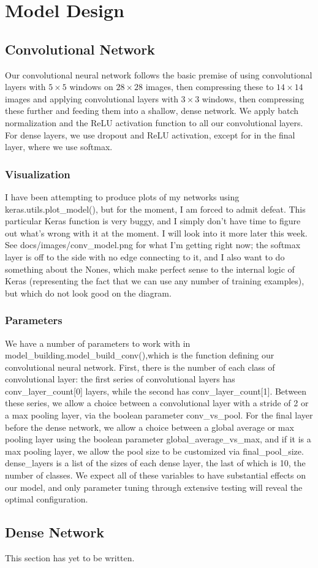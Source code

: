 \section{Model Design}

\subsection{Convolutional Network}
Our convolutional neural network follows the basic premise of using convolutional layers with $5\times 5$ windows on $28\times 28$ images, then compressing these to $14\times 14$ images and applying convolutional layers with $3\times 3$ windows, then compressing these further and feeding them into a shallow, dense network. We apply batch normalization and the ReLU activation function to all our convolutional layers. For dense layers, we use dropout and ReLU activation, except for in the final layer, where we use softmax.

\subsubsection{Visualization}
I have been attempting to produce plots of my networks using {\ttfamily keras.utils.plot\_model()}, but for the moment, I am forced to admit defeat. This particular Keras function is very buggy, and I simply don't have time to figure out what's wrong with it at the moment. I will look into it more later this week. See {\ttfamily docs/images/conv\_model.png} for what I'm getting right now; the softmax layer is off to the side with no edge connecting to it, and I also want to do something about the {\ttfamily None}s, which make perfect sense to the internal logic of Keras (representing the fact that we can use any number of training examples), but which do not look good on the diagram.

\subsubsection{Parameters} \label{convolutionalparams}
We have a number of parameters to work with in {\ttfamily model\_building.model\_build\_conv()},which is the function defining our convolutional neural network. First, there is the number of each class of convolutional layer: the first series of convolutional layers has {\ttfamily conv\_layer\_count[0]} layers, while the second has {\ttfamily conv\_layer\_count[1]}. Between these series, we allow a choice between a convolutional layer with a stride of 2 or a max pooling layer, via the boolean parameter {\ttfamily conv\_vs\_pool}. For the final layer before the dense network, we allow a choice between a global average or max pooling layer using the boolean parameter {\ttfamily global\_average\_vs\_max}, and if it is a max pooling layer, we allow the pool size to be customized via {\ttfamily final\_pool\_size}. {\ttfamily dense\_layers} is a list of the sizes of each dense layer, the last of which is 10, the number of classes. We expect all of these variables to have substantial effects on our model, and only parameter tuning through extensive testing will reveal the optimal configuration.

\subsection{Dense Network}
This section has yet to be written.